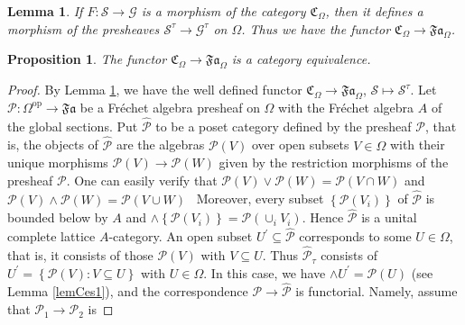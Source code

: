 \documentclass[10pt,a4paper]{amsart}
\newtheorem{lemma}{Lemma}
\newtheorem{proposition}{Proposition}
\begin{document}
\begin{lemma}
\label{lemCes2}If $F:\mathcal{S}\rightarrow\mathcal{G}$ is a morphism of the
category $\mathfrak{C}_{\Omega}$, then it defines a morphism of the presheaves
$\mathcal{S}^{\tau}\rightarrow\mathcal{G}^{\tau}$ on $\Omega$. Thus we have
the functor $\mathfrak{C}_{\Omega}\rightarrow\mathfrak{Fa}_{\Omega}$.
\end{lemma}

\begin{proposition}
\label{corCes1}The functor $\mathfrak{C}_{\Omega}\rightarrow\mathfrak{Fa}%
_{\Omega}$ is a category equivalence.
\end{proposition}

\begin{proof}
By Lemma \ref{lemCes2}, we have the well defined functor $\mathfrak{C}%
_{\Omega}\rightarrow\mathfrak{Fa}_{\Omega}$, $\mathcal{S\mapsto S}^{\tau}$.
Let $\mathcal{P}:\Omega^{\operatorname{op}}\rightarrow\mathfrak{Fa}$ be a
Fr\'{e}chet algebra presheaf on $\Omega$ with the Fr\'{e}chet algebra $A$ of
the global sections. Put $\widehat{\mathcal{P}}$ to be a poset category
defined by the presheaf $\mathcal{P}$, that is, the objects of
$\widehat{\mathcal{P}}$ are the algebras $\mathcal{P}\left(  V\right)  $ over
open subsets $V\in\Omega$ with their unique morphisms $\mathcal{P}\left(
V\right)  \rightarrow\mathcal{P}\left(  W\right)  $ given by the restriction
morphisms of the presheaf $\mathcal{P}$. One can easily verify that
$\mathcal{P}\left(  V\right)  \vee\mathcal{P}\left(  W\right)  =\mathcal{P}%
\left(  V\cap W\right)  $ and $\mathcal{P}\left(  V\right)  \wedge
\mathcal{P}\left(  W\right)  =\mathcal{P}\left(  V\cup W\right)  $ \ Moreover,
every subset $\left\{  \mathcal{P}\left(  V_{i}\right)  \right\}  $ of
$\widehat{\mathcal{P}}$ is bounded below by $A$ and $\wedge\left\{
\mathcal{P}\left(  V_{i}\right)  \right\}  =\mathcal{P}\left(  \cup_{i}%
V_{i}\right)  $. Hence $\widehat{\mathcal{P}}$ is a unital complete lattice
$A$-category. An open subset $U^{\prime}\subseteq\widehat{\mathcal{P}}$
corresponds to some $U\in\Omega$, that is, it consists of those $\mathcal{P}%
\left(  V\right)  $ with $V\subseteq U$. Thus $\widehat{\mathcal{P}}_{\tau}$
consists of $U^{\prime}=\left\{  \mathcal{P}\left(  V\right)  :V\subseteq
U\right\}  $ with $U\in\Omega$. In this case, we have $\wedge U^{\prime
}=\mathcal{P}\left(  U\right)  $ (see Lemma \ref{lemCes1}), and the
correspondence $\mathcal{P}\longrightarrow\widehat{\mathcal{P}}$ is
functorial. Namely, assume that $\mathcal{P}_{1}\rightarrow\mathcal{P}_{2}$ is

\end{proof}
\end{document}

